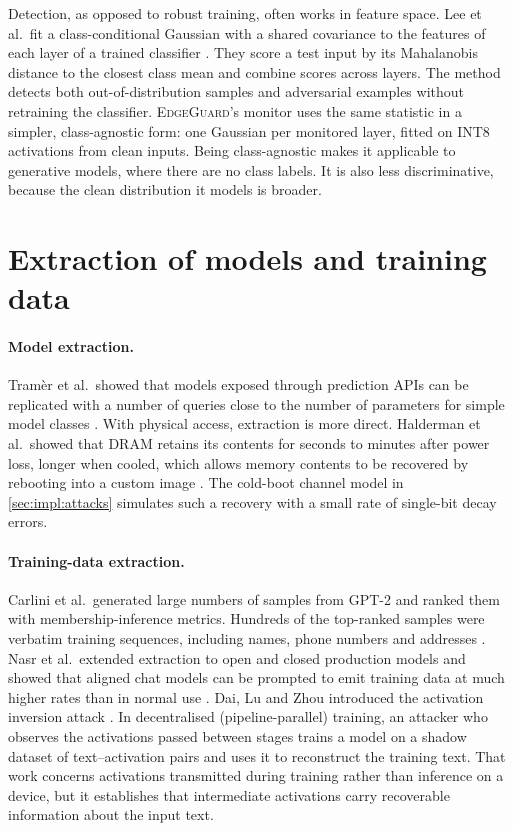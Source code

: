 Detection, as opposed to robust training, often works in feature space. Lee et al.\ fit a
class-conditional Gaussian with a shared covariance to the features of each layer of a trained
classifier \cite{lee2018simple}. They score a test input by its Mahalanobis distance to the
closest class mean and combine scores across layers. The method detects both out-of-distribution
samples and adversarial examples without retraining the classifier. \textsc{EdgeGuard}'s
monitor uses the same statistic in a simpler, class-agnostic form: one Gaussian per monitored
layer, fitted on INT8 activations from clean inputs. Being class-agnostic makes it applicable to
generative models, where there are no class labels. It is also less discriminative, because the
clean distribution it models is broader.

\section{Extraction of models and training data}
\label{sec:rw:extract}

\paragraph{Model extraction.} Tram\`er et al.\ showed that models exposed through prediction
APIs can be replicated with a number of queries close to the number of parameters for simple
model classes \cite{tramer2016stealing}. With physical access, extraction is more direct.
Halderman et al.\ showed that DRAM retains its contents for seconds to minutes after power
loss, longer when cooled, which allows memory contents to be recovered by rebooting into a
custom image \cite{halderman2008lest}. The cold-boot channel model in
\cref{sec:impl:attacks} simulates such a recovery with a small rate of single-bit decay errors.

\paragraph{Training-data extraction.} Carlini et al.\ generated large numbers of samples from
GPT-2 and ranked them with membership-inference metrics. Hundreds of the top-ranked samples
were verbatim training sequences, including names, phone numbers and addresses
\cite{carlini2021extracting}. Nasr et al.\ extended extraction to open and closed production
models and showed that aligned chat models can be prompted to emit training data at much
higher rates than in normal use \cite{nasr2023scalable}. Dai, Lu and Zhou introduced the
activation inversion attack \cite{dai2025activation}. In decentralised (pipeline-parallel)
training, an attacker who observes the activations passed between stages trains a model on a
shadow dataset of text--activation pairs and uses it to reconstruct the training text. That
work concerns activations transmitted during training rather than inference on a device, but it
establishes that intermediate activations carry recoverable information about the input text.

